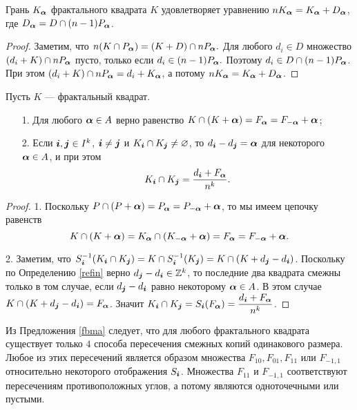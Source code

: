 \begin{proposition}\label{prop:Ka}
Грань $K_{\bm{\alpha}}$ фрактального квадрата $K$ удовлетворяет уравнению $n K_{\bm{\alpha}}=K_{\bm{\alpha}}+D_{\bm{\alpha}}$, где $D_{\bm{\alpha}}=D\cap(n-1)P_{\bm{\alpha}}$.
\end{proposition}

\begin{proof}
Заметим, что $n(K\cap P_{\bm{\alpha}})=(K+D)\cap nP_{\bm{\alpha}}.$ 
Для любого $d_i\in D$ множество $(d_i+K)\cap nP_{\bm{\alpha}}$ пусто, только если $d_i\in(n-1)P_{\bm{\alpha}}.$ 
Поэтому $d_i\in D\cap (n-1)P_{\bm{\alpha}}$. 
При этом $(d_i+K)\cap nP_{\bm{\alpha}}=d_i+K_{\bm{\alpha}}$, а потому $n K_{\bm{\alpha}}={K_{\bm{\alpha}}+D_{\bm{\alpha}}}$.
\end{proof}



\begin{proposition}\label{fbma}
Пусть $K$ --- фрактальный квадрат.
\begin{itemize}[nolistsep]
\item[1.] Для любого ${\bm{\alpha}}\in A$ верно равенство $K\cap(K+{\bm{\alpha}})=F_{\bm{\alpha}}=F_{-{\bm{\alpha}}}+{\bm{\alpha}} $;
\item[2.] Если ${\bm{i}},{\bm{j}} \in I^k$, ${\bm{i}}\neq {\bm{j}}$ и $K_{\bm{i}}\cap K_{\bm{j}}\neq\varnothing$, то $d_{\bm{i}}-d_{\bm{j}}={\bm{\alpha}}$ для некоторого ${\bm{\alpha}}\in A$, и при этом 
$$K_{\bm{i}}\cap K_{\bm{j}}=\dfrac{d_{\bm{i}}+F_{\bm{\alpha}}}{n^k}.$$
\end{itemize}
\end{proposition}

\begin{proof}
1. Поскольку $P\cap (P+{\bm{\alpha}})=P_{\bm{\alpha}}=P_{-{\bm{\alpha}}}+{\bm{\alpha}}$, то мы имеем цепочку равенств 
$$K\cap(K+{\bm{\alpha}})= K_{\bm{\alpha}}\cap (K_{-{\bm{\alpha}}}+{\bm{\alpha}})=F_{\bm{\alpha}}=F_{-{\bm{\alpha}}}+{\bm{\alpha}}.$$

2. Заметим, что $S_{\bm{i}}^{-1}(K_{\bm{i}}\cap K_{\bm{j}})=K\cap S_{\bm{i}}^{-1}(K_{\bm{j}})=K\cap (K+d_{\bm{j}}-d_{\bm{i}})$. 
Поскольку по Определению \ref{refin} верно $d_{\bm{j}}-d_{\bm{i}}\in\mathbb{Z}^k$, то последние два квадрата смежны только в том случае, если $d_{\bm{j}}-d_{\bm{i}}$ равно некоторому ${\bm{\alpha}}\in A$. 
В этом случае $K\cap(K+d_{\bm{j}}-d_{\bm{i}})=F_{\bm{\alpha}}$.
Значит $K_{\bm{i}}\cap K_{\bm{j}}= S_{\bm{i}}(F_{\bm{\alpha}})= \dfrac{d_{\bm{i}}+F_{\bm{\alpha}}}{n^k}$. 
\end{proof}

Из Предложения \ref{fbma} следует, что для любого фрактального квадрата существует только $4$ способа пересечения смежных копий одинакового размера. 
Любое из этих пересечений является образом множества $F_{10}, F_{01}, F_{11}$ или $ F_{-1,1}$ относительно некоторого отображения $S_{\bm{i}}$. 
Множества $F_{11}$ и $ F_{-1,1}$ соответствуют пересечениям противоположных углов, а потому являются одноточечными или пустыми. 

